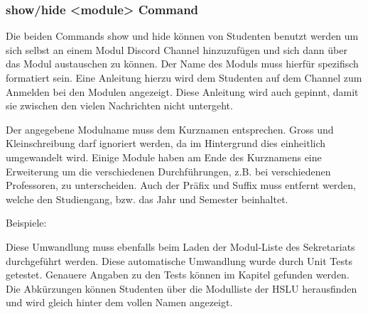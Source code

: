 \documentclass[a4paper, table]{article}
\begin{document}
\subsubsection{show/hide <module> Command}

Die beiden Commands show und hide können von Studenten benutzt werden um sich selbst an einem Modul Discord Channel hinzuzufügen und sich dann über das Modul austauschen zu können.
Der Name des Moduls muss hierfür spezifisch formatiert sein.
Eine Anleitung hierzu wird dem Studenten auf dem Channel zum Anmelden bei den Modulen angezeigt.
Diese Anleitung wird auch gepinnt, damit sie zwischen den vielen Nachrichten nicht untergeht.

Der angegebene Modulname muss dem Kurznamen entsprechen.
Gross und Kleinschreibung darf ignoriert werden, da im Hintergrund dies einheitlich umgewandelt wird.
Einige Module haben am Ende des Kurznamens eine Erweiterung um die verschiedenen Durchführungen, z.B. bei verschiedenen Professoren, zu unterscheiden.
Auch der Präfix und Suffix muss entfernt werden, welche den Studiengang, bzw. das Jahr und Semester beinhaltet.

Beispiele:


Diese Umwandlung muss ebenfalls beim Laden der Modul-Liste des Sekretariats durchgeführt werden.
Diese automatische Umwandlung wurde durch Unit Tests getestet.
Genauere Angaben zu den Tests können im Kapitel  gefunden werden.
Die Abkürzungen können Studenten über die Modulliste der HSLU herausfinden und wird gleich hinter dem vollen Namen angezeigt.\autocite{noauthor_bachelor_nodate}
\end{document}
